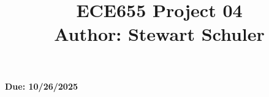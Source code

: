 \documentclass[a4paper,12pt]{article}
\begin{document}
	\title{ECE655 Project 04\\
		\vspace{4pt}
		\small{Author: Stewart Schuler}
		\vspace{-12pt}}
	\date{}
	\maketitle
	\begin{center}
		\textbf{Due: 10/26/2025}
	\end{center}
	
	\tableofcontents
	
	
	

	
\end{document}
